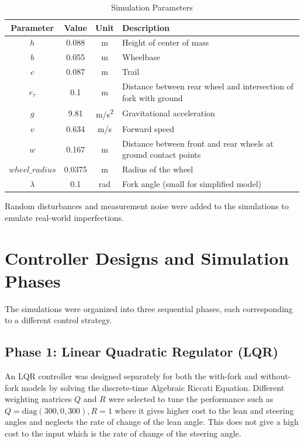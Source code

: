\begin{table}[H]
	\centering
	\caption{Simulation Parameters}
	\label{tab:simulation_parameters}
	\begin{tabular}{|c|c|c|p{6cm}|}
		\hline
		\textbf{Parameter} & \textbf{Value} & \textbf{Unit} & \textbf{Description} \\ \hline
		$h$ & 0.088 & m & Height of center of mass \\ \hline
		$b$ & 0.055 & m & Wheelbase \\ \hline
		$c$ & 0.087 & m & Trail \\ \hline
		$r_\tau$ & 0.1 & m & Distance between rear wheel and intersection of fork with ground \\ \hline
		$g$ & 9.81 & m/s\textsuperscript{2} & Gravitational acceleration \\ \hline
		$v$ & 0.634 & m/s & Forward speed \\ \hline
		$w$ & 0.167 & m & Distance between front and rear wheels at ground contact points \\ \hline
		$wheel\_radius$ & 0.0375 & m & Radius of the wheel \\ \hline
		$\lambda$ & 0.1 & rad & Fork angle (small for simplified model) \\ \hline
	\end{tabular}
\end{table}

Random disturbances and measurement noise were added to the simulations to emulate real-world imperfections.

\section{Controller Designs and Simulation Phases}

The simulations were organized into three sequential phases, each corresponding to a different control strategy.

\subsection{Phase 1: Linear Quadratic Regulator (LQR)}
\label{subsec:lqr}

An LQR controller was designed separately for both the with-fork and without-fork models by solving the discrete-time Algebraic Riccati Equation.
Different weighting matrices $Q$ and $R$ were selected to tune the performance such as $Q = \text{diag}(300, 0, 300), R = 1$ where it gives higher cost to the lean and steering angles and neglects the rate of change of the lean angle. This does not give a high cost to the input which is the rate of change of the steering angle.

